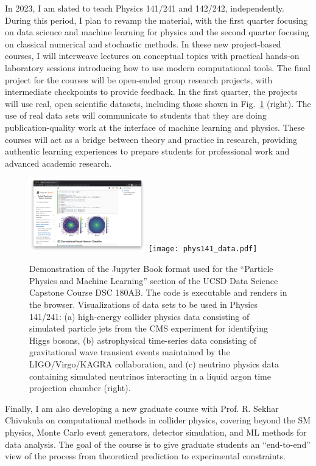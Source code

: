 \documentclass[11pt,letterpaper,notitlepage]{article}
\begin{document}
In 2023, I am slated to teach Physics 141/241 and 142/242, independently.
During this period, I plan to revamp the material, with the first quarter focusing on data science and machine learning for physics and the second quarter focusing on classical numerical and stochastic methods.
In these new project-based courses, I will interweave lectures on conceptual topics with practical hands-on laboratory sessions introducing how to use modern computational tools.
The final project for the courses will be open-ended group research projects, with intermediate checkpoints to provide feedback.
In the first quarter, the projects will use real, open scientific datasets, including those shown in Fig.~\ref{fig:teaching} (right).
The use of real data sets will communicate to students that they are doing publication-quality work at the interface of machine learning and physics.
These courses will act as a bridge between theory and practice in research, providing authentic learning experiences to prepare students for professional work and advanced academic research.

\begin{figure}[htb]
    \centering
    \includegraphics[width=0.45\textwidth]{jupyter_book.png}
    \texttt{[image: phys141\_data.pdf]}
    \caption{Demonstration of the Jupyter Book format used for the ``Particle Physics and Machine Learning'' section of the UCSD Data Science Capstone Course DSC 180AB.
        The code is executable and renders in the browser.
        Visualizations of data sets to be used in Physics 141/241: (a) high-energy collider physics data consisting of simulated particle jets from the CMS experiment for identifying Higgs bosons, (b) astrophysical time-series data consisting of gravitational wave transient events maintained by the LIGO/Virgo/KAGRA collaboration, and (c) neutrino physics data containing simulated neutrinos interacting in a liquid argon time projection chamber (right).
        \label{fig:teaching}}
\end{figure}

Finally, I am also developing a new graduate course with Prof. R. Sekhar Chivukula on computational methods in collider physics, covering beyond the SM physics, Monte Carlo event generators, detector simulation, and ML methods for data analysis.
The goal of the course is to give graduate students an ``end-to-end'' view of the process from theoretical prediction to experimental constraints.
\end{document}
